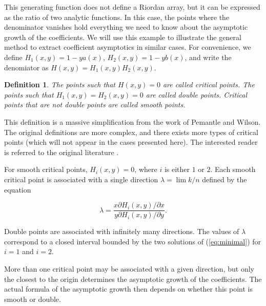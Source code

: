 \documentclass{article}
\newtheorem{definition}{Definition}
\begin{document}
This generating function does not define a Riordan array, but it can be
expressed as the ratio of two analytic functions. In this case, the points
where the denominator vanishes hold everything we need to know about the
asymptotic growth of the coefficients. We will use this example to
illustrate the general method to extract coefficient asymptotics in
similar cases. For convenience, we define $H_1(x,y) = 1-ya(x)$, $H_2(x,y)
= 1-yb(x)$, and write the denomiator as $H(x,y) = H_1(x,y)H_2(x,y)$.

\begin{definition}
The points such that $H(x,y) = 0$ are called critical points.  The points
such that $H_1(x,y) = H_2(x,y) = 0$ are called double points. Critical
points that are not double points are called smooth points.
\end{definition}

This definition is a massive simplification from the work of Pemantle and
Wilson. The original definitions are more complex, and there exists more
types of critical points (which will not appear in the cases presented
here). The interested reader is referred to the original literature
\cite{PemWil02, PemWil08, AnalComb2013}.

For smooth critical points, $H_i(x,y) = 0$, where $i$ is either $1$ or
$2$. Each smooth critical point is associated with a single direction
$\lambda = \lim k/n$ defined by the equation

\begin{equation}
\label{eq:minimal}
\lambda =
\frac{x\partial H_i(x,y)/\partial x}{y\partial H_i(x,y)/\partial y}.
\end{equation}

Double points are associated with infinitely many directions. The values
of $\lambda$ correspond to a closed interval bounded by the two solutions
of (\ref{eq:minimal}) for $i=1$ and $i=2$.

More than one critical point may be associated with a given direction, but
only the closest to the origin determines the asymptotic growth of the
coefficients. The actual formula of the asymptotic growth then depends on
whether this point is smooth or double. 
\end{document}
